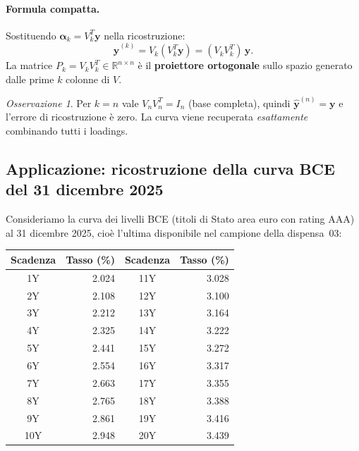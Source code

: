 \documentclass[11pt,a4paper]{article}
\theoremstyle{plain}
\theoremstyle{definition}
\theoremstyle{remark}
\newtheorem*{osservazione}{Osservazione}
\begin{document}
\paragraph{Formula compatta.}
Sostituendo $\boldsymbol{\alpha}_k = V_k^T \mathbf{y}$ nella ricostruzione:
\[
  \hat{\mathbf{y}}^{(k)} = V_k (V_k^T \mathbf{y}) = (V_k V_k^T)\,\mathbf{y}.
\]
La matrice $P_k = V_k V_k^T \in \mathbb{R}^{n \times n}$ è il \textbf{proiettore
ortogonale} sullo spazio generato dalle prime $k$ colonne di $V$.

\begin{osservazione}
Per $k = n$ vale $V_n V_n^T = I_n$ (base completa), quindi
$\hat{\mathbf{y}}^{(n)} = \mathbf{y}$ e l'errore di ricostruzione è zero.
La curva viene recuperata \emph{esattamente} combinando tutti i loadings.
\end{osservazione}

\subsection{Applicazione: ricostruzione della curva BCE del 31 dicembre 2025}

Consideriamo la curva dei livelli BCE (titoli di Stato area euro con rating AAA)
al 31 dicembre 2025, cio\`e l'ultima disponibile nel campione della
dispensa~03:

\begin{center}
\small
\renewcommand{\arraystretch}{1.15}
\begin{tabular}{cr @{\hspace{2em}} cr}
\toprule
Scadenza & \multicolumn{1}{c}{Tasso (\%)} & Scadenza & \multicolumn{1}{c}{Tasso (\%)} \\
\midrule
 1Y & 2.024 & 11Y & 3.028 \\
 2Y & 2.108 & 12Y & 3.100 \\
 3Y & 2.212 & 13Y & 3.164 \\
 4Y & 2.325 & 14Y & 3.222 \\
 5Y & 2.441 & 15Y & 3.272 \\
 6Y & 2.554 & 16Y & 3.317 \\
 7Y & 2.663 & 17Y & 3.355 \\
 8Y & 2.765 & 18Y & 3.388 \\
 9Y & 2.861 & 19Y & 3.416 \\
10Y & 2.948 & 20Y & 3.439 \\
\bottomrule
\end{tabular}
\end{center}
\end{document}
